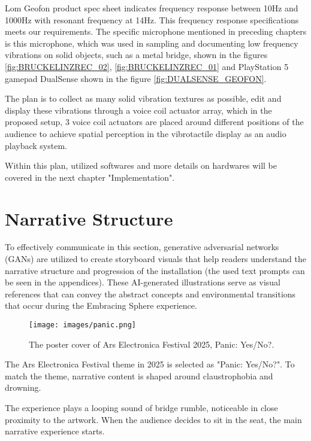             Lom Geofon product spec sheet indicates frequency response between 10Hz and 1000Hz with resonant frequency at 14Hz. This frequency response specifications meets our requirements. The specific microphone mentioned in preceding chapters is this microphone, which was used in sampling and documenting low frequency vibrations on solid objects, such as a metal bridge, shown in the figures \ref{fig:BRUCKELINZREC_02}, \ref{fig:BRUCKELINZREC_01} and PlayStation 5 gamepad DualSense shown in the figure \ref{fig:DUALSENSE_GEOFON}.\par

            The plan is to collect as many solid vibration textures as possible, edit and display these vibrations through a voice coil actuator array, which in the proposed setup, 3 voice coil actuators are placed around different positions of the audience to achieve spatial perception in the vibrotactile display as an audio playback system.\par

            Within this plan, utilized softwares and more details on hardwares will be covered in the next chapter "Implementation".\par
    \section{Narrative Structure}
        To effectively communicate in this section, generative adversarial networks (GANs) are utilized to create storyboard visuals that help readers understand the narrative structure and progression of the installation (the used text prompts can be seen in the appendices). These AI-generated illustrations serve as visual references that can convey the abstract concepts and environmental transitions that occur during the Embracing Sphere experience.\par

        \begin{figure}[H]
            \centering
            \texttt{[image: images/panic.png]}
            \caption{The poster cover of Ars Electronica Festival 2025, Panic: Yes/No?.}
            \label{fig:PANIC}
        \end{figure}

        The Ars Electronica Festival theme in 2025 is selected as "Panic: Yes/No?". To match the theme, narrative content is shaped around claustrophobia and drowning.\par

        The experience plays a looping sound of bridge rumble, noticeable in close proximity to the artwork. When the audience decides to sit in the seat, the main narrative experience starts.\par

